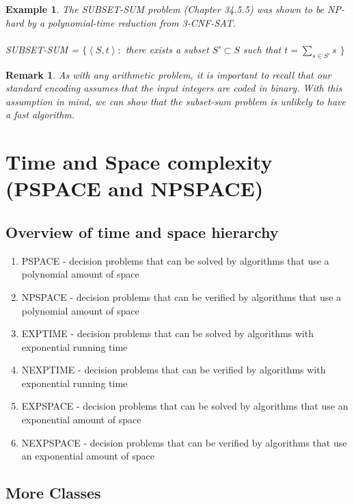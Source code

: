 \documentclass[12pt]{article}
\newtheorem*{remark}{Remark}
\newtheorem{example}{Example}
\begin{document}
\begin{example}
    The SUBSET-SUM problem (Chapter 34.5.5) was shown to be NP-hard by a polynomial-time reduction from 3-CNF-SAT.
    \\
    \\
    SUBSET-SUM = $\{\left \langle S, t \right \rangle : $ there exists a subset $S' \subset S $ such that $t =  {\textstyle \sum_{s\in S'}s} $ $\}$
\end{example}

\begin{remark}
    As with any arithmetic problem, it is important to recall that our standard encoding assumes that the input integers are coded in binary. With this assumption in mind, we can show that the subset-sum problem is unlikely to have a fast algorithm.
\end{remark}

\section{Time and Space complexity (PSPACE and NPSPACE)}

\subsection{Overview of time and space hierarchy}

\begin{enumerate}
    \item PSPACE - decision problems that can be solved by algorithms that use a polynomial amount of space
    \item NPSPACE - decision problems that can be verified by algorithms that use a polynomial amount of space
    \item EXPTIME - decision problems that can be solved by algorithms with exponential running time
    \item NEXPTIME - decision problems that can be verified by algorithms with exponential running time
    \item EXPSPACE - decision problems that can be solved by algorithms that use an exponential amount of space
    \item NEXPSPACE - decision problems that can be verified by algorithms that use an exponential amount of space
\end{enumerate}

\subsection{More Classes}
\end{document}
